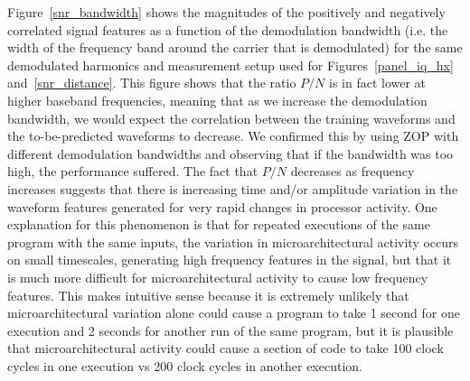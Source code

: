 Figure~\ref{snr_bandwidth} shows the magnitudes of the positively and negatively correlated signal features as a function of the demodulation bandwidth (i.e. the width of the frequency band around the carrier that is demodulated) for the same demodulated harmonics and measurement setup used for Figures~\ref{panel_iq_hx} and~\ref{snr_distance}. This figure shows that the ratio $P/N$ is in fact lower at higher baseband frequencies, meaning that as we increase the demodulation bandwidth, we would expect the correlation between the training waveforms and the to-be-predicted waveforms to decrease. We confirmed this by using ZOP with different demodulation bandwidths and observing that if the bandwidth was too high, the performance suffered. The fact that $P/N$ decreases as frequency increases suggests that there is increasing time and/or amplitude variation in the waveform features generated for very rapid changes in processor activity. One explanation for this phenomenon is that for repeated executions of the same program with the same inputs, the variation in microarchitectural activity occurs on small timescales, generating high frequency features in the signal, but that it is much more difficult for microarchitectural activity to cause low frequency features. This makes intuitive sense because it is extremely unlikely that microarchitectural variation alone could cause a program to take 1 second for one execution and 2 seconds for another run of the same program, but it is plausible that microarchitectural activity could cause a section of code to take 100 clock cycles in one execution vs 200 clock cycles in another execution. 






